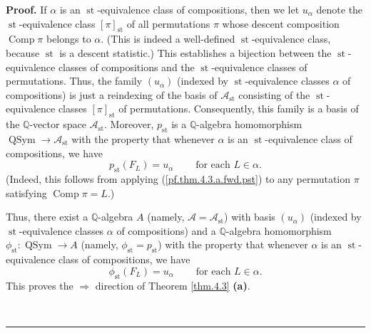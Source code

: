 \documentclass[numbers=enddot,12pt,final,onecolumn,notitlepage]{scrartcl}%
\theoremstyle{definition}
\newenvironment{proof}[1][Proof]{\noindent\textbf{#1.} }{\ \rule{0.5em}{0.5em}}
\newenvironment{verlong}{}{}
\begin{document}
\begin{verlong}
\begin{proof}
If $\alpha$ is an $\operatorname*{st}$-equivalence class of compositions, then
we let $u_{\alpha}$ denote the $\operatorname*{st}$-equivalence class $\left[
\pi\right]  _{\operatorname*{st}}$ of all permutations $\pi$ whose descent
composition $\operatorname*{Comp}\pi$ belongs to $\alpha$. (This is indeed a
well-defined $\operatorname*{st}$-equivalence class, because
$\operatorname*{st}$ is a descent statistic.) This establishes a bijection
between the $\operatorname*{st}$-equivalence classes of compositions and the
$\operatorname*{st}$-equivalence classes of permutations. Thus, the family
$\left(  u_{\alpha}\right)  $ (indexed by $\operatorname*{st}$-equivalence
classes $\alpha$ of compositions) is just a reindexing of the basis of
$\mathcal{A}_{\operatorname*{st}}$ consisting of the $\operatorname*{st}%
$-equivalence classes $\left[  \pi\right]  _{\operatorname*{st}}$ of
permutations. Consequently, this family is a basis of the $\mathbb{Q}$-vector
space $\mathcal{A}_{\operatorname*{st}}$. Moreover, $p_{\operatorname*{st}}$
is a $\mathbb{Q}$-algebra homomorphism $\operatorname*{QSym}\rightarrow
\mathcal{A}_{\operatorname*{st}}$ with the property that whenever $\alpha$ is
an $\operatorname*{st}$-equivalence class of compositions, we have%
\[
p_{\operatorname*{st}}\left(  F_{L}\right)  =u_{\alpha}%
\ \ \ \ \ \ \ \ \ \ \text{for each }L\in\alpha.
\]
(Indeed, this follows from applying (\ref{pf.thm.4.3.a.fwd.pst}) to any
permutation $\pi$ satisfying $\operatorname*{Comp}\pi=L$.)

Thus, there exist a $\mathbb{Q}$-algebra $A$ (namely, $\mathcal{A}%
=\mathcal{A}_{\operatorname*{st}}$) with basis $\left(  u_{\alpha}\right)  $
(indexed by $\operatorname*{st}$-equivalence classes $\alpha$ of compositions)
and a $\mathbb{Q}$-algebra homomorphism $\phi_{\operatorname*{st}%
}:\operatorname*{QSym}\rightarrow A$ (namely, $\phi_{\operatorname*{st}%
}=p_{\operatorname*{st}}$) with the property that whenever $\alpha$ is an
$\operatorname*{st}$-equivalence class of compositions, we have%
\[
\phi_{\operatorname*{st}}\left(  F_{L}\right)  =u_{\alpha}%
\ \ \ \ \ \ \ \ \ \ \text{for each }L\in\alpha.
\]
This proves the $\Longrightarrow$ direction of Theorem \ref{thm.4.3}
\textbf{(a)}.


\end{proof}
\end{verlong}
\end{document}
